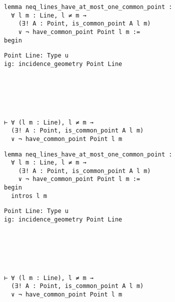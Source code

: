 \begin{frame}[fragile]
	\begin{multicols}{2}
		\begin{lstlisting}
lemma neq_lines_have_at_most_one_common_point :
  ∀ l m : Line, l ≠ m → 
    (∃! A : Point, is_common_point A l m) 
    ∨ ¬ have_common_point Point l m := 
begin
\end{lstlisting}
		\columnbreak
		\begin{lstlisting}
Point Line: Type u
ig: incidence_geometry Point Line






⊢ ∀ (l m : Line), l ≠ m → 
  (∃! A : Point, is_common_point A l m) 
  ∨ ¬ have_common_point Point l m
		\end{lstlisting}
	\end{multicols}
\end{frame}










\begin{frame}[fragile]
	\begin{multicols}{2}
		\begin{lstlisting}
lemma neq_lines_have_at_most_one_common_point :
  ∀ l m : Line, l ≠ m → 
    (∃! A : Point, is_common_point A l m) 
    ∨ ¬ have_common_point Point l m := 
begin
  intros l m
\end{lstlisting}
		\columnbreak
		\begin{lstlisting}
Point Line: Type u
ig: incidence_geometry Point Line






⊢ ∀ (l m : Line), l ≠ m → 
  (∃! A : Point, is_common_point A l m) 
  ∨ ¬ have_common_point Point l m
		\end{lstlisting}
	\end{multicols}
\end{frame}










